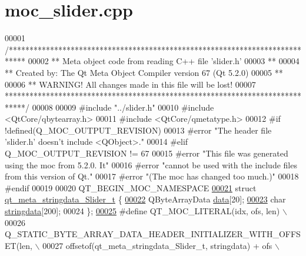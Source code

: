 \hypertarget{a00019_source}{\section{moc\+\_\+slider.\+cpp}
\label{a00019_source}
}

\begin{DoxyCode}
00001 \textcolor{comment}{/****************************************************************************}
00002 \textcolor{comment}{** Meta object code from reading C++ file 'slider.h'}
00003 \textcolor{comment}{**}
00004 \textcolor{comment}{** Created by: The Qt Meta Object Compiler version 67 (Qt 5.2.0)}
00005 \textcolor{comment}{**}
00006 \textcolor{comment}{** WARNING! All changes made in this file will be lost!}
00007 \textcolor{comment}{*****************************************************************************/}
00008 
00009 \textcolor{preprocessor}{#include "../slider.h"}
00010 \textcolor{preprocessor}{#include <QtCore/qbytearray.h>}
00011 \textcolor{preprocessor}{#include <QtCore/qmetatype.h>}
00012 \textcolor{preprocessor}{#if !defined(Q\_MOC\_OUTPUT\_REVISION)}
00013 \textcolor{preprocessor}{#error "The header file 'slider.h' doesn't include <QObject>."}
00014 \textcolor{preprocessor}{#elif Q\_MOC\_OUTPUT\_REVISION != 67}
00015 \textcolor{preprocessor}{#error "This file was generated using the moc from 5.2.0. It"}
00016 \textcolor{preprocessor}{#error "cannot be used with the include files from this version of Qt."}
00017 \textcolor{preprocessor}{#error "(The moc has changed too much.)"}
00018 \textcolor{preprocessor}{#endif}
00019 
00020 QT\_BEGIN\_MOC\_NAMESPACE
\hypertarget{a00019_source_l00021}{}\hyperlink{a00019}{00021} \textcolor{keyword}{struct }\hyperlink{a00019_d8/dfa/a00121}{qt\_meta\_stringdata\_Slider\_t} \{
\hypertarget{a00019_source_l00022}{}\hyperlink{a00019_a28e23ecab9373bb818a81f9a092a52de}{00022}     QByteArrayData \hyperlink{a00019_a28e23ecab9373bb818a81f9a092a52de}{data}[20];
\hypertarget{a00019_source_l00023}{}\hyperlink{a00019_aa9f32a65077d2d4f1c99ac3536a308da}{00023}     \textcolor{keywordtype}{char} \hyperlink{a00019_aa9f32a65077d2d4f1c99ac3536a308da}{stringdata}[200];
00024 \};
\hypertarget{a00019_source_l00025}{}\hyperlink{a00019_a75bb9482d242cde0a06c9dbdc6b83abe}{00025} \textcolor{preprocessor}{#define QT\_MOC\_LITERAL(idx, ofs, len) \(\backslash\)}
00026 \textcolor{preprocessor}{    Q\_STATIC\_BYTE\_ARRAY\_DATA\_HEADER\_INITIALIZER\_WITH\_OFFSET(len, \(\backslash\)}
00027 \textcolor{preprocessor}{    offsetof(qt\_meta\_stringdata\_Slider\_t, stringdata) + ofs \(\backslash\)}

\end{DoxyCode}
